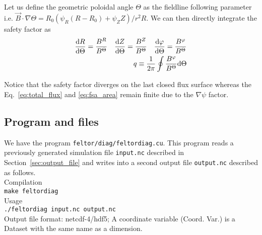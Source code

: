 Let us define the geometric poloidal angle $\Theta$ as the fieldline following
parameter i.e. $\vec B\cdot\nabla\Theta = R_0(\psi_R (R-R_0) + \psi_Z Z)/r^2R$.
We can then directly integrate the safety factor as
\begin{align}\label{eq:safety_factor}
\frac{\mathrm{d} R}{\mathrm{d}\Theta} = \frac{B^R}{B^\Theta}\quad 
\frac{\mathrm{d} Z}{\mathrm{d}\Theta} = \frac{B^Z}{B^\Theta}\quad 
\frac{\mathrm{d} \varphi}{\mathrm{d}\Theta} = \frac{B^\varphi}{B^\Theta}\\
q\equiv\frac{1}{2\pi}\oint \frac{B^\varphi}{B^\Theta} \mathrm{d}\Theta
\end{align}

Notice that the safety factor diverges on the last closed flux
surface whereas the Eq.~\eqref{eq:total_flux} and \eqref{eq:fsa_area}
remain finite due to the $\nabla\psi$ factor.
\subsection{Program and files}
We have the program \texttt{feltor/diag/feltordiag.cu}.
This program reads a previously generated simulation file \texttt{input.nc} described in Section~\ref{sec:output_file} and writes into a second output file \texttt{output.nc} described as follows. \\
Compilation\\
\texttt{make feltordiag} \\
Usage \\
\texttt{./feltordiag input.nc output.nc} \\

Output file format: netcdf-4/hdf5; A coordinate variable (Coord. Var.) is a Dataset with the same name as a dimension.


